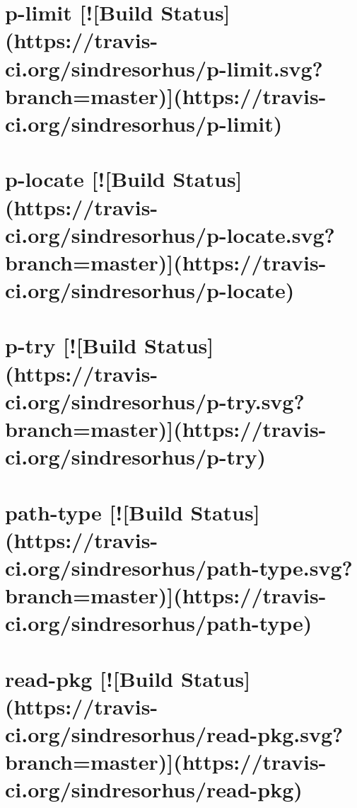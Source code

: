 \documentclass[twoside]{book}
\newcommand{\+}{\discretionary{\mbox{\scriptsize$\hookleftarrow$}}{}{}}
\begin{document}
\chapter{p-\/limit \mbox{[}!\mbox{[}Build Status\mbox{]}(https\+://travis-\/ci.org/sindresorhus/p-\/limit.svg?branch=master)\mbox{]}(https\+://travis-\/ci.org/sindresorhus/p-\/limit)}
\label{md_dsmacc_examples_DRmerge_node_modules_get-package-info_node_modules_p-limit_readme}

\chapter{p-\/locate \mbox{[}!\mbox{[}Build Status\mbox{]}(https\+://travis-\/ci.org/sindresorhus/p-\/locate.svg?branch=master)\mbox{]}(https\+://travis-\/ci.org/sindresorhus/p-\/locate)}
\label{md_dsmacc_examples_DRmerge_node_modules_get-package-info_node_modules_p-locate_readme}

\chapter{p-\/try \mbox{[}!\mbox{[}Build Status\mbox{]}(https\+://travis-\/ci.org/sindresorhus/p-\/try.svg?branch=master)\mbox{]}(https\+://travis-\/ci.org/sindresorhus/p-\/try)}
\label{md_dsmacc_examples_DRmerge_node_modules_get-package-info_node_modules_p-try_readme}

\chapter{path-\/type \mbox{[}!\mbox{[}Build Status\mbox{]}(https\+://travis-\/ci.org/sindresorhus/path-\/type.svg?branch=master)\mbox{]}(https\+://travis-\/ci.org/sindresorhus/path-\/type)}
\label{md_dsmacc_examples_DRmerge_node_modules_get-package-info_node_modules_path-type_readme}

\chapter{read-\/pkg \mbox{[}!\mbox{[}Build Status\mbox{]}(https\+://travis-\/ci.org/sindresorhus/read-\/pkg.svg?branch=master)\mbox{]}(https\+://travis-\/ci.org/sindresorhus/read-\/pkg)}
\label{md_dsmacc_examples_DRmerge_node_modules_get-package-info_node_modules_read-pkg_readme}

\end{document}
